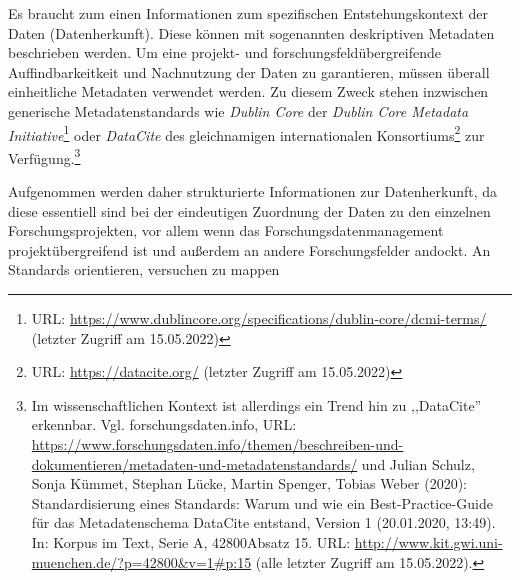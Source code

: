 Es braucht zum einen Informationen zum spezifischen Entstehungskontext der Daten (Datenherkunft). Diese können mit sogenannten deskriptiven Metadaten beschrieben werden. Um eine projekt- und forschungsfeldübergreifende Auffindbarkeitkeit und Nachnutzung der Daten zu garantieren, müssen überall einheitliche Metadaten verwendet werden. Zu diesem Zweck stehen inzwischen generische Metadatenstandards wie \textit{Dublin Core} der \textit{Dublin Core Metadata Initiative}\footnote{URL: \url{https://www.dublincore.org/specifications/dublin-core/dcmi-terms/} (letzter Zugriff am 15.05.2022)} oder \textit{DataCite} des gleichnamigen internationalen Konsortiums\footnote{URL: \url{https://datacite.org/} (letzter Zugriff am 15.05.2022)} zur Verfügung.\footnote{Im wissenschaftlichen Kontext ist allerdings ein Trend hin zu ,,DataCite'' erkennbar. Vgl. forschungsdaten.info, URL: \url{https://www.forschungsdaten.info/themen/beschreiben-und-dokumentieren/metadaten-und-metadatenstandards/} und Julian Schulz, Sonja Kümmet, Stephan Lücke, Martin Spenger, Tobias Weber (2020): Standardisierung eines Standards: Warum und wie ein Best-Practice-Guide für das Metadatenschema DataCite entstand, Version 1 (20.01.2020, 13:49). In: Korpus im Text, Serie A, 42800Absatz 15. URL: \url{http://www.kit.gwi.uni-muenchen.de/?p=42800&v=1\#p:15} (alle letzter Zugriff am 15.05.2022).}

Aufgenommen werden daher strukturierte Informationen zur Datenherkunft, da diese essentiell sind bei der eindeutigen Zuordnung der Daten zu den einzelnen Forschungsprojekten, vor allem wenn das Forschungsdatenmanagement projektübergreifend ist und außerdem an andere Forschungsfelder andockt. An Standards orientieren, versuchen zu mappen

